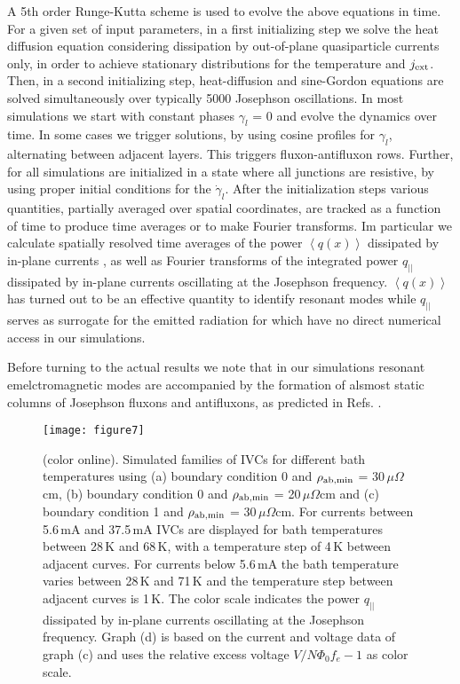 \documentclass[aps,twocolumn,prb,showpacs,preprintnumbers,superscriptaddress,amsmath,amssymb,longbibliography]{revtex4-1}
\begin{document}
A 5th order Runge-Kutta scheme is used to evolve the above equations in time.
For a given set of input parameters, in a first initializing step we solve the heat diffusion equation considering dissipation by out-of-plane quasiparticle currents only, in order to achieve stationary distributions for the temperature and $j_{\rm{ext}}$. Then, in a second initializing step, heat-diffusion and sine-Gordon equations are solved simultaneously over typically 5000 Josephson oscillations. In most simulations we start with constant phases $\gamma_l$ = 0 and evolve the dynamics over time. In some cases we trigger solutions, by using cosine profiles for $\gamma_l$, alternating between adjacent layers. This triggers fluxon-antifluxon rows. Further, for all simulations are initialized in a state where all junctions are resistive, by using proper initial conditions for the $\dot{\gamma}_{l}$. 
After the initialization steps various quantities, partially averaged over spatial coordinates, are tracked as a function of time to produce time averages or to make Fourier transforms. Im particular we calculate spatially resolved time averages of the power $\left\langle q(x)\right\rangle$ dissipated by in-plane currents \cite{Rudau15}, as well as Fourier transforms of the integrated power $q_{||}$ dissipated by in-plane currents oscillating at the Josephson frequency. $\left\langle q(x)\right\rangle$ has turned out to be an effective quantity to identify resonant modes while $q_{||}$ serves as surrogate for the emitted radiation for which have no direct numerical access in our simulations. 

Before turning to the actual results we note that in our simulations resonant emelctromagnetic modes are accompanied by the formation of alsmost static columns of Josephson fluxons and antifluxons\cite{Rudau15,Rudau16}, as predicted in Refs. .    

\begin{figure}[b]
\texttt{[image: figure7]}
\caption{(color online). Simulated families of IVCs for different bath temperatures using  (a) boundary condition 0 and $\rho_{\rm {ab,min}}$ = 30\,$\mu\Omega$cm, (b) boundary condition 0 and $\rho_{\rm {ab,min}}$ = 20\,$\mu\Omega$cm and (c) boundary condition 1 and $\rho_{\rm {ab,min}}$ = 30\,$\mu\Omega$cm. 
For currents between 5.6\,mA and 37.5\,mA IVCs are displayed for bath temperatures between 28\,K and 68\,K, with a temperature step of 4\,K between adjacent curves. For currents below 5.6\,mA the bath temperature varies between 28\,K and 71\,K and the temperature step between adjacent curves is 1\,K. The color scale indicates the power $q_{||}$ dissipated by in-plane currents oscillating at the Josephson frequency. Graph (d) is based on the current and voltage data of graph (c) and uses the relative excess voltage $V/N\Phi_0f_e -1 $ as color scale. 
}
\label{fig:theo_IVE}
\end{figure}
\end{document}
